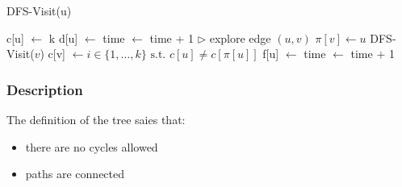 \begin{algorithm}[ht]
\small
\caption{DFS-Visit(u)}
\begin{algorithmic}
    \STATE c[u] $\gets$ k
    \STATE d[u] $\gets$ time $\gets$ time + 1
       \STATE $\triangleright$ explore edge $(u,v)$
           \STATE $\pi[v] \gets u$
           \STATE DFS-Visit($v$)
       \ENDIF
     \ENDFOR
     \STATE c[v] $\gets i \in \{1,\ldots,k\} \text{ s.t. } c[u] \neq c[\pi[u]]$
     \STATE f[u] $\gets$ time $\gets$ time + 1
\end{algorithmic}
\end{algorithm}


\subsubsection{Description}
The definition of the tree saies that:
\begin{itemize}
 \item there are no cycles allowed
 \item paths are connected
\end{itemize}
